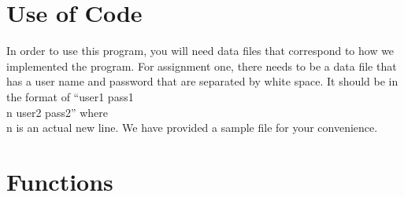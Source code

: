 \documentclass[pdftex, 12pt]{article}
\begin{document}
\section{Use of Code}

In order to use this program, you will need data files that correspond to how we implemented the program. For assignment
one, there needs to be a data file that has a user name and password that are separated by white space. It should be in
the format of ``user1 pass1 \\n user2 pass2'' where \\n is an actual new line. We have provided a sample file for your
convenience.

\section{Functions}

\end{document}
